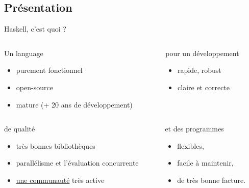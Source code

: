 \documentclass[presentation]{beamer}
\begin{document}
\subsection{Présentation}
\label{sec:org21f4dbf}
\begin{frame}[label={sec:org00e6cb1}]{Haskell, c'est quoi ?}
\begin{block}{}
\begin{columns}
\begin{column}{0.5\columnwidth}
\begin{block}{Un language}
\begin{itemize}
\item purement fonctionnel
\item open-source
\item mature (+ 20 ans de développement)
\end{itemize}
\end{block}
\end{column}
\begin{column}{0.5\columnwidth}
\begin{block}{pour un développement}
\begin{itemize}
\item rapide,  robust
\end{itemize}

\begin{itemize}
\item claire et  correcte
\end{itemize}
\end{block}
\end{column}
\end{columns}
\end{block}
\begin{block}{}
\begin{columns}
\begin{column}{0.6\columnwidth}
\begin{block}{de qualité}
\begin{itemize}
\item très bonnes bibliothèques
\item parallélisme et l'évaluation concurrente
\item \href{https://wiki.haskell.org/Haskell}{une communauté} très active
\end{itemize}
\end{block}
\end{column}

\begin{column}{0.4\columnwidth}
\begin{block}{et des programmes}
\begin{itemize}
\item flexibles,
\item facile à maintenir,
\item de très bonne facture.
\end{itemize}
\end{block}
\end{column}
\end{columns}
\end{block}
\end{frame}
\end{document}
